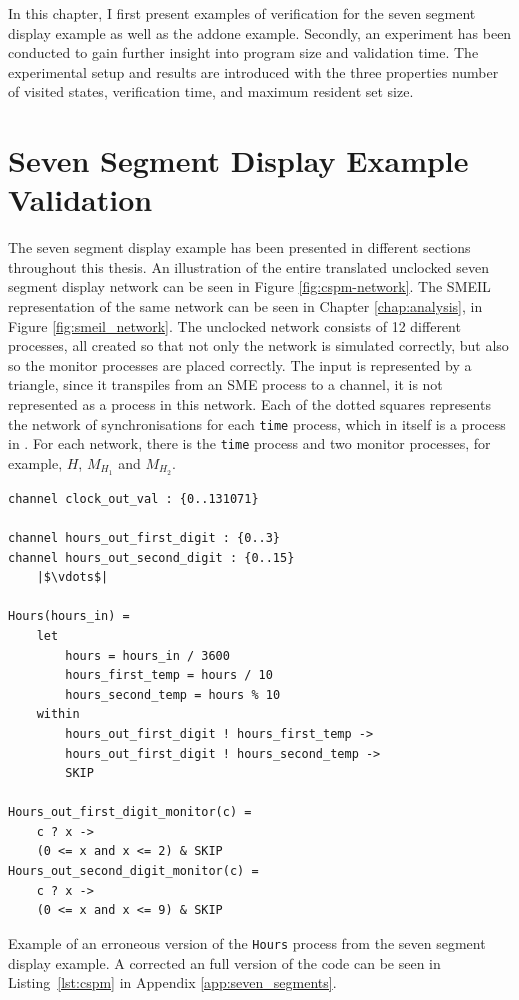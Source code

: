 
In this chapter, I first present examples of verification for the seven segment display example as well as the addone example. Secondly, an experiment has been conducted to gain further insight into program size and validation time. The experimental setup and results are introduced with the three properties number of visited states, verification time, and maximum resident set size.
\section{Seven Segment Display Example Validation}
The seven segment display example has been presented in different sections throughout this thesis. An illustration of the entire translated unclocked seven segment display network can be seen in Figure \ref{fig:cspm-network}. The SMEIL representation of the same network can be seen in Chapter \ref{chap:analysis}, in Figure \ref{fig:smeil_network}.
The unclocked \cspm{} network consists of 12 different processes, all created so that not only the network is simulated correctly, but also so the monitor processes are placed correctly. The input is represented by a triangle, since it transpiles from an SME process to a \cspm{} channel, it is not represented as a process in this network. Each of the dotted squares represents the network of synchronisations for each \texttt{time} process, which in itself is a process in \cspm{}. For each network, there is the \texttt{time} process and two monitor processes, for example, $H$, $M_{H_1}$ and $M_{H_2}$.
\\

\begin{listing}
\begin{verbatim}
channel clock_out_val : {0..131071}

channel hours_out_first_digit : {0..3}
channel hours_out_second_digit : {0..15}
    |$\vdots$|

Hours(hours_in) =
    let
        hours = hours_in / 3600
        hours_first_temp = hours / 10
        hours_second_temp = hours % 10
    within
        hours_out_first_digit ! hours_first_temp ->
        hours_out_first_digit ! hours_second_temp ->
        SKIP

Hours_out_first_digit_monitor(c) =
    c ? x ->
    (0 <= x and x <= 2) & SKIP
Hours_out_second_digit_monitor(c) =
    c ? x ->
    (0 <= x and x <= 9) & SKIP

\end{verbatim}
\caption{Example of an erroneous version of the \texttt{Hours} process from the \cspm{} seven segment display example. A corrected an full version of the code can be seen in Listing~\ref{lst:cspm} in Appendix \ref{app:seven_segments}.}
\label{lst:cspm_error}
\end{listing}

